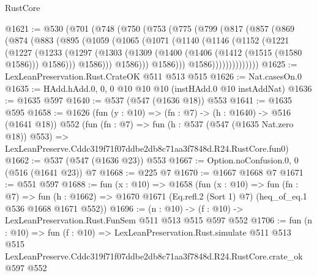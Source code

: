 \begin{lexlean}{RustCore}
\begin{coremodule}
@1621 := @530
    (@701
      (@748
        (@750
          (@753
            (@775
              (@799
                (@817
                  (@857
                    (@869
                      (@874
                        (@883
                          (@895
                            (@1059
                              (@1065
                                (@1071
                                  (@1140
                                    (@1146
                                      (@1152
                                        (@1221
                                          (@1227
                                            (@1233
                                              (@1297
                                                (@1303
                                                  (@1309
                                                    (@1400
                                                      (@1406 (@1412 (@1515 (@1580 @1586))) @1586)))
                                                  @1586)))
                                            @1586)))
                                      @1586)))
                                @1586))))))))))))))
@1625 := LexLeanPreservation.Rust.CrateOK @511 @513 @515
@1626 := Nat.casesOn.{0}
@1635 := HAdd.hAdd.{0, 0, 0} @10 @10 @10 (instHAdd.{0} @10 instAddNat)
@1636 := @1635 @597
@1640 := @537 (@547 (@1636 @18)) @553
@1641 := @1635 @595
@1658 := @1626
    (fun (y : @10) => (fn : @7) -> (h : @1640) -> @516 (@1641 @18))
    @552
    (fun (fn : @7) =>
    fun (h : @537 (@547 (@1635 Nat.zero @18)) @553) =>
    LexLeanPreserve.Cddc319f71f07ddbe2db8c71aa3f7848d.R24.RustCore.fun0)
@1662 := @537 (@547 (@1636 @23)) @553
@1667 := Option.noConfusion.{0, 0} (@516 (@1641 @23)) @7
@1668 := @225 @7
@1670 := @1667 @1668 @7
@1671 := @551 @597
@1688 := fun (x : @10) =>
  @1658
    (fun (x : @10) =>
    fun (fn : @7) =>
    fun (h : @1662) => @1670 @1671 (Eq.refl.{2} (Sort 1) @7) (heq_of_eq.{1} @536 @1668 @1671 @552))
@1696 := (n : @10) -> (f : @10) -> LexLeanPreservation.Rust.FunSem @511 @513 @515 @597 @552
@1706 := fun (n : @10) =>
  fun (f : @10) =>
  LexLeanPreservation.Rust.simulate
    @511
    @513
    @515
    LexLeanPreserve.Cddc319f71f07ddbe2db8c71aa3f7848d.R24.RustCore.crate_ok
    @597
    @552
\end{coremodule}
\end{lexlean}
